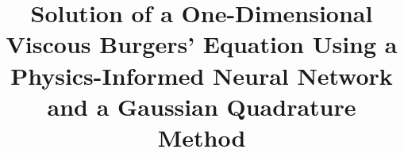 \documentclass[conference]{IEEEtran}
\begin{document}

\title{Solution of a One-Dimensional Viscous Burgers' Equation Using a Physics-Informed Neural Network and a Gaussian Quadrature Method
}

\author{
}

\maketitle
\thispagestyle{plain}
\pagestyle{plain}
\end{document}

